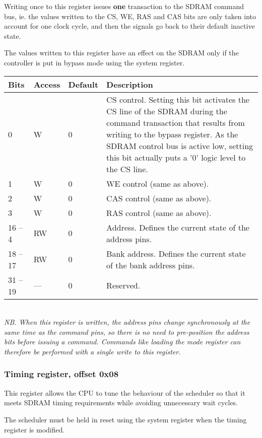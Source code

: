 \documentclass[a4paper,11pt]{article}
\begin{document}
Writing once to this register issues \textbf{one} transaction to the SDRAM command bus, ie. the values written to the CS, WE, RAS and CAS bits are only taken into account for one clock cycle, and then the signals go back to their default inactive state.

The values written to this register have an effect on the SDRAM only if the controller is put in bypass mode using the system register.\\

\begin{tabular}{|p{1.5cm}|l|l|p{10cm}|}
\hline
\bf Bits & \bf Access & \bf Default & \bf Description \\
\hline
0 & W & 0 & CS control. Setting this bit activates the CS line of the SDRAM during the command transaction that results from writing to the bypass register. As the SDRAM control bus is active low, setting this bit actually puts a '0' logic level to the CS line. \\
\hline
1 & W & 0 & WE control (same as above). \\
\hline
2 & W & 0 & CAS control (same as above). \\
\hline
3 & W & 0 & RAS control (same as above). \\
\hline
16 -- 4 & RW & 0 & Address. Defines the current state of the address pins. \\
\hline
18 -- 17 & RW & 0 & Bank address. Defines the current state of the bank address pins. \\
\hline
31 -- 19 & --- & 0 & Reserved. \\
\hline
\end{tabular}\\

\textit{NB. When this register is written, the address pins change synchronously at the same time as the command pins, so there is no need to pre-position the address bits before issuing a command. Commands like loading the mode register can therefore be performed with a single write to this register.}

\subsubsection{Timing register, offset 0x08}
This register allows the CPU to tune the behaviour of the scheduler so that it meets SDRAM timing requirements while avoiding unnecessary wait cycles.

The scheduler must be held in reset using the system register when the timing register is modified.\\
\end{document}
